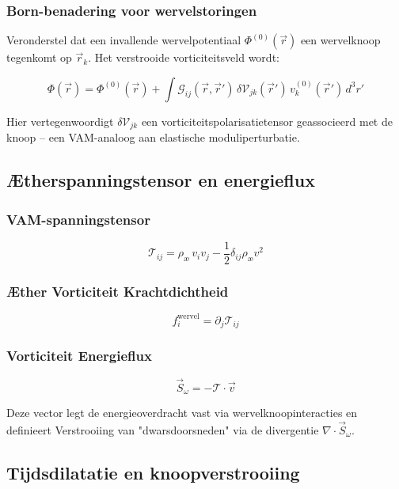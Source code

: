 \subsubsection*{Born-benadering voor wervelstoringen}

Veronderstel dat een invallende wervelpotentiaal \(\Phi^{(0)}(\vec{r})\) een wervelknoop tegenkomt op \(\vec{r}_k\). Het verstrooide vorticiteitsveld wordt:

\[
\Phi(\vec{r}) = \Phi^{(0)}(\vec{r}) + \int \mathcal{G}_{ij}(\vec{r}, \vec{r}') \, \delta \mathcal{V}_{jk}(\vec{r}') \, v_k^{(0)}(\vec{r}') \, d^3r'
\]

Hier vertegenwoordigt \(\delta \mathcal{V}_{jk}\) een vorticiteitspolarisatietensor geassocieerd met de knoop – een VAM-analoog aan elastische moduliperturbatie.

\subsection{Ætherspanningstensor en energieflux}

\subsubsection*{VAM-spanningstensor}

\[
\mathcal{T}_{ij} = \rho_{\text{\ae}} \, v_i v_j - \frac{1}{2} \delta_{ij} \rho_{\text{\ae}} v^2
\]

\subsubsection*{Æther Vorticiteit Krachtdichtheid}

\[
f_i^{\text{wervel}} = \partial_j \mathcal{T}_{ij}
\]

\subsubsection*{Vorticiteit Energieflux}

\[
\vec{S}_\omega = - \mathcal{T} \cdot \vec{v}
\]

Deze vector legt de energieoverdracht vast via wervelknoopinteracties en definieert Verstrooiing van "dwarsdoorsneden" via de divergentie \(\nabla \cdot \vec{S}_\omega\).

\subsection{Tijdsdilatatie en knoopverstrooiing}

